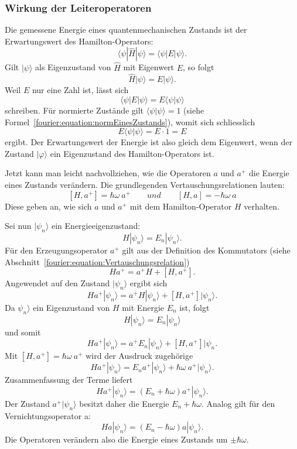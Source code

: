 		\subsubsection{Wirkung der Leiteroperatoren\label{fourier:subsubsection:WirkungLeiteroperatoren}}
			Die gemessene Energie eines quantenmechanischen Zustands ist der Erwartungswert des Hamilton-Operators:
			\begin{equation}
				\langle\psi|\hat{H}|\psi\rangle = \langle\psi|E|\psi\rangle.
			\end{equation}
			Gilt $|\psi\rangle$ als Eigenzustand von $\hat{H}$ mit Eigenwert $E$, so folgt
			\begin{equation}
				\hat{H}|\psi\rangle = E|\psi\rangle.
			\end{equation}
			Weil $E$ nur eine Zahl ist, lässt sich
			\[
				\langle\psi|E|\psi\rangle = E \langle\psi|\psi\rangle
			\]
			schreiben.
			Für normierte Zustände gilt $\langle\psi|\psi\rangle = 1$ (siehe Formel~\ref{fourier:equation:normEinesZustands}), womit sich schliesslich
			\[
				E \langle\psi|\psi\rangle = E \cdot 1 = E
			\]
			ergibt.
			Der Erwartungswert der Energie ist also gleich dem Eigenwert, wenn der Zustand $|\varphi\rangle$ ein Eigenzustand des Hamilton-Operators ist.

			Jetzt kann man leicht nachvollziehen, wie die Operatoren $a$ und $a^+$ die Energie eines Zustands verändern.
			Die grundlegenden Vertauschungsrelationen lauten:
			\[
				[H, a^+] = \hbar\omega~a^+
				\qquad
				und
				\qquad
				[H, a] = -\hbar\omega~a
			\]
			Diese geben an, wie sich $a$ und $a^+$ mit dem Hamilton-Operator $H$ verhalten.

			Sei nun $|\psi_n\rangle$ ein Energieeigenzustand:
			\[
				H|\psi_n\rangle = E_n|\psi_n\rangle.
			\]
			Für den Erzeugungsoperator $a^+$ gilt aus der Definition des Kommutators (siehe Abschnitt~\ref{fourier:equation:Vertauschungsrelation})
			\[
				H a^+ = a^+ H + [H, a^+].
			\]
			Angewendet auf den Zustand $|\psi_n\rangle$ ergibt sich
			\[
				H a^+|\psi_n\rangle = a^+ H|\psi_n\rangle + [H, a^+]|\psi_n\rangle.
			\]
			Da $\psi_n\rangle$ ein Eigenzustand von $H$ mit Energie $E_n$ ist, folgt
			\[
				H|\psi_n\rangle = E_n|\psi_n\rangle
			\]
			und somit
			\[
				H a^+|\psi_n\rangle = a^+ E_n|\psi_n\rangle + [H, a^+]|\psi_n.
			\]
			Mit $[H, a^+] = \hbar\omega~a^+$ wird der Ausdruck zugehörige
			\[
				H a^+|\psi_n\rangle = E_n a^+|\psi_n\rangle + \hbar\omega~a^+|\psi_n\rangle.
			\]
			Zusammenfassung der Terme liefert
			\begin{equation}
				H a^+|\psi_n\rangle = (E_n + \hbar\omega)a^+|\psi_n\rangle.
			\end{equation}
			Der Zustand $a^+|\psi_n\rangle$ besitzt daher die Energie $E_n + \hbar\omega$.
			Analog gilt für den Vernichtungsoperator a:
			\begin{equation}
				H a |\psi_n\rangle = (E_n - \hbar\omega)a|\psi_n\rangle.
			\end{equation}
			Die Operatoren verändern also die Energie eines Zustands um $\pm\hbar\omega$.

